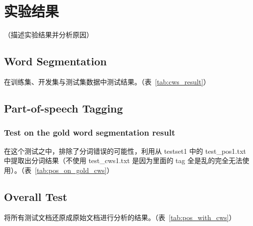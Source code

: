\section{实验结果}
\label{sec:result}

（描述实验结果并分析原因）

\subsection*{Word Segmentation}

在训练集、开发集与测试集数据中测试结果。（表~\ref{tab:cws_result}）



\subsection*{Part-of-speech Tagging}

\subsubsection*{Test on the gold word segmentation result}

在这个测试之中，排除了分词错误的可能性，利用从 testset1 中的 test\_pos1.txt 中提取出分词结果（不使用 test\_cws1.txt 是因为里面的 tag 全是乱的完全无法使用）。（表~\ref{tab:pos_on_gold_cws}）



\subsection*{Overall Test}

将所有测试文档还原成原始文档进行分析的结果。（表~\ref{tab:pos_with_cws}）


